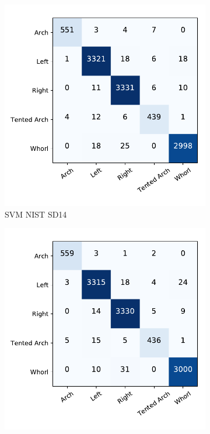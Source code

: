 \begin{figure}[!ht]
	\begin{subfigure}[b]{0.25\textwidth}
		\centering
		\includegraphics[width=\linewidth]{fig/figs/confusion_matrix_svm_sd14.pdf}
		\caption{SVM NIST SD14 }
		\label{fig.cnf_matrix_5class.svm_sd14}
	\end{subfigure}%
	\begin{subfigure}[b]{0.25\textwidth}
		\centering
		\includegraphics[width=\linewidth]{fig/figs/confusion_matrix_net_sd14.pdf}

\end{subfigure}
\end{figure}
